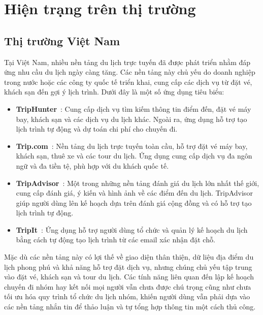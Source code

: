 \section{Hiện trạng trên thị trường}
\subsection{Thị trường Việt Nam}

Tại Việt Nam, nhiều nền tảng du lịch trực tuyến đã được phát triển nhằm đáp ứng nhu cầu du lịch ngày càng tăng. Các nền tảng này chủ yếu do doanh nghiệp trong nước hoặc các công ty quốc tế triển khai, cung cấp các dịch vụ từ đặt vé, khách sạn đến gợi ý lịch trình. Dưới đây là một số ứng dụng tiêu biểu:

\begin{itemize}
    \item \textbf{TripHunter}~\cite{triphunter}: Cung cấp dịch vụ tìm kiếm thông tin điểm đến, đặt vé máy bay, khách sạn và các dịch vụ du lịch khác. Ngoài ra, ứng dụng hỗ trợ tạo lịch trình tự động và dự toán chi phí cho chuyến đi.

    \item \textbf{Trip.com}~\cite{tripcom}: Nền tảng du lịch trực tuyến toàn cầu, hỗ trợ đặt vé máy bay, khách sạn, thuê xe và các tour du lịch. Ứng dụng cung cấp dịch vụ đa ngôn ngữ và đa tiền tệ, phù hợp với du khách quốc tế.

    \item \textbf{TripAdvisor}~\cite{tripadvisor}: Một trong những nền tảng đánh giá du lịch lớn nhất thế giới, cung cấp đánh giá, ý kiến và hình ảnh về các điểm đến du lịch. TripAdvisor giúp người dùng lên kế hoạch dựa trên đánh giá cộng đồng và có hỗ trợ tạo lịch trình tự động.

    \item \textbf{TripIt}~\cite{tripit}: Ứng dụng hỗ trợ người dùng tổ chức và quản lý kế hoạch du lịch bằng cách tự động tạo lịch trình từ các email xác nhận đặt chỗ.

\end{itemize}

Mặc dù các nền tảng này có lợi thế về giao diện thân thiện, dữ liệu địa điểm du lịch phong phú và khả năng hỗ trợ đặt dịch vụ, nhưng chúng chủ yếu tập trung vào đặt vé, khách sạn và tour du lịch. Các tính năng liên quan đến lập kế hoạch chuyến đi nhóm hay kết nối mọi người vẫn chưa được chú trọng cũng như chưa tối ưu hóa quy trình tổ chức du lịch nhóm, khiến người dùng vẫn phải dựa vào các nền tảng nhắn tin để thảo luận và tự tổng hợp thông tin một cách thủ công.


